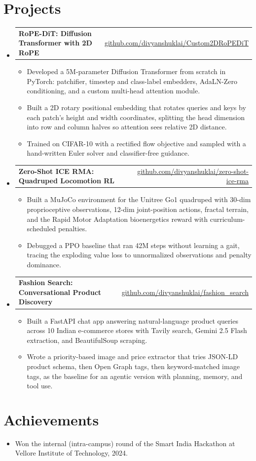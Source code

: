 \documentclass[letterpaper,11pt]{article}
\makeatletter
\newcommand{\resumeItem}[1]{
  \item\small{#1}
}
\newcommand{\resumeProjectHeading}[2]{
    \item
    \begin{tabular*}{0.97\textwidth}{l@{\extracolsep{\fill}}r}
      \small#1 & \small#2 \\
    \end{tabular*}\vspace{-5pt}
}
\newcommand{\resumeSubHeadingListStart}{\begin{itemize}[leftmargin=0.15in, label={}, itemsep=0pt]}
\newcommand{\resumeSubHeadingListEnd}{\end{itemize}\vspace{-11pt}}
\newcommand{\resumeItemListStart}{\begin{itemize}[itemsep=2pt, parsep=0pt, topsep=0pt]}
\newcommand{\resumeItemListEnd}{\end{itemize}\vspace{-6pt}}
\makeatother
\begin{document}
\section{Projects}
    \resumeSubHeadingListStart

      \resumeProjectHeading
          {\textbf{RoPE-DiT: Diffusion Transformer with 2D RoPE}}{\href{https://github.com/divyanshuklai/Custom2DRoPEDiT}{\uline{github.com/divyanshuklai/Custom2DRoPEDiT}}}
          \resumeItemListStart
            \resumeItem{Developed a 5M-parameter Diffusion Transformer from scratch in PyTorch: patchifier, timestep and class-label embedders, AdaLN-Zero conditioning, and a custom multi-head attention module.}
            \resumeItem{Built a 2D rotary positional embedding that rotates queries and keys by each patch's height and width coordinates, splitting the head dimension into row and column halves so attention sees relative 2D distance.}
            \resumeItem{Trained on CIFAR-10 with a rectified flow objective and sampled with a hand-written Euler solver and classifier-free guidance.}
          \resumeItemListEnd

      \resumeProjectHeading
          {\textbf{Zero-Shot ICE RMA: Quadruped Locomotion RL}}{\href{https://github.com/divyanshuklai/zero-shot-ice-rma}{\uline{github.com/divyanshuklai/zero-shot-ice-rma}}}
          \resumeItemListStart
            \resumeItem{Built a MuJoCo environment for the Unitree Go1 quadruped with 30-dim proprioceptive observations, 12-dim joint-position actions, fractal terrain, and the Rapid Motor Adaptation bioenergetics reward with curriculum-scheduled penalties.}
            \resumeItem{Debugged a PPO baseline that ran 42M steps without learning a gait, tracing the exploding value loss to unnormalized observations and penalty dominance.}
          \resumeItemListEnd

      \resumeProjectHeading
          {\textbf{Fashion Search: Conversational Product Discovery}}{\href{https://github.com/divyanshuklai/fashion_search}{\uline{github.com/divyanshuklai/fashion\_search}}}
          \resumeItemListStart
            \resumeItem{Built a FastAPI chat app answering natural-language product queries across 10 Indian e-commerce stores with Tavily search, Gemini 2.5 Flash extraction, and BeautifulSoup scraping.}
            \resumeItem{Wrote a priority-based image and price extractor that tries JSON-LD product schema, then Open Graph tags, then keyword-matched image tags, as the baseline for an agentic version with planning, memory, and tool use.}
          \resumeItemListEnd

    \resumeSubHeadingListEnd

\section{Achievements}
  \resumeSubHeadingListStart
    \resumeItem{Won the internal (intra-campus) round of the Smart India Hackathon at Vellore Institute of Technology, 2024.}
  \resumeSubHeadingListEnd
\end{document}

